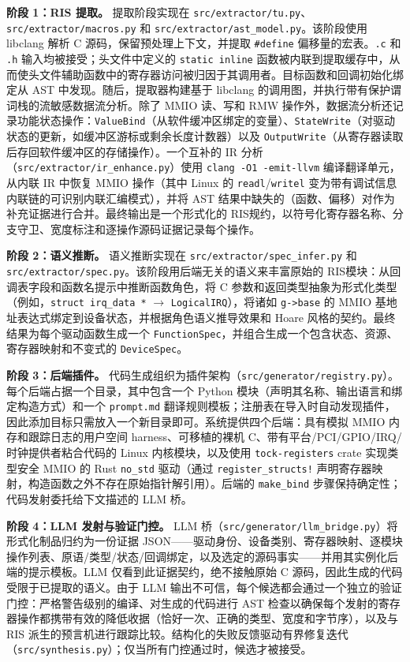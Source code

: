 \documentclass[sigplan, screen, review, anonymous]{acmart}
\newcommand{\rislang}{RIS}
\begin{document}
\textbf{阶段 1：RIS 提取。} 提取阶段实现在 \texttt{src/extractor/tu.py}、\texttt{src/extractor/macros.py} 和 \texttt{src/extractor/ast\_model.py}。该阶段使用 libclang 解析 C 源码，保留预处理上下文，并提取 \texttt{\#define} 偏移量的宏表。\texttt{.c} 和 \texttt{.h} 输入均被接受；头文件中定义的 \texttt{static inline} 函数被内联到提取缓存中，从而使头文件辅助函数中的寄存器访问被归因于其调用者。目标函数和回调初始化绑定从 AST 中发现。随后，提取器构建基于 libclang 的调用图，并执行带有保护谓词栈的流敏感数据流分析。除了 MMIO 读、写和 RMW 操作外，数据流分析还记录功能状态操作：\texttt{ValueBind}（从软件缓冲区绑定的变量）、\texttt{StateWrite}（对驱动状态的更新，如缓冲区游标或剩余长度计数器）以及 \texttt{OutputWrite}（从寄存器读取后存回软件缓冲区的存储操作）。一个互补的 IR 分析（\texttt{src/extractor/ir\_enhance.py}）使用 \texttt{clang -O1 -emit-llvm} 编译翻译单元，从内联 IR 中恢复 MMIO 操作（其中 Linux 的 \texttt{readl}/\texttt{writel} 变为带有调试信息内联链的可识别内联汇编模式），并将 AST 结果中缺失的（函数、偏移）对作为补充证据进行合并。最终输出是一个形式化的 \rislang 规约，以符号化寄存器名称、分支守卫、宽度标注和逐操作源码证据记录每个操作。

\textbf{阶段 2：语义推断。} 语义推断实现在 \texttt{src/extractor/spec\_infer.py} 和 \texttt{src/extractor/spec.py}。该阶段用后端无关的语义来丰富原始的 \rislang 模块：从回调表字段和函数名提示中推断函数角色，将 C 参数和返回类型抽象为形式化类型（例如，\texttt{struct irq\_data *} $\rightarrow$ \texttt{LogicalIRQ}），将诸如 \texttt{g->base} 的 MMIO 基地址表达式绑定到设备状态，并根据角色语义推导效果和 Hoare 风格的契约。最终结果为每个驱动函数生成一个 \texttt{FunctionSpec}，并组合生成一个包含状态、资源、寄存器映射和不变式的 \texttt{DeviceSpec}。

\textbf{阶段 3：后端插件。} 代码生成组织为插件架构（\texttt{src/generator/registry.py}）。每个后端占据一个目录，其中包含一个 Python 模块（声明其名称、输出语言和绑定构造方式）和一个 \texttt{prompt.md} 翻译规则模板；注册表在导入时自动发现插件，因此添加目标只需放入一个新目录即可。系统提供四个后端：具有模拟 MMIO 内存和跟踪日志的用户空间 harness、可移植的裸机 C、带有平台/PCI/GPIO/IRQ/时钟提供者粘合代码的 Linux 内核模块，以及使用 \texttt{tock-registers} crate 实现类型安全 MMIO 的 Rust \texttt{no\_std} 驱动（通过 \texttt{register\_structs!} 声明寄存器映射，构造函数之外不存在原始指针解引用）。后端的 \texttt{make\_bind} 步骤保持确定性；代码发射委托给下文描述的 LLM 桥。

\textbf{阶段 4：LLM 发射与验证门控。} LLM 桥（\texttt{src/generator/llm\_bridge.py}）将形式化制品归约为一份证据 JSON——驱动身份、设备类别、寄存器映射、逐模块操作列表、原语/类型/状态/回调绑定，以及选定的源码事实——并用其实例化后端的提示模板。LLM 仅看到此证据契约，绝不接触原始 C 源码，因此生成的代码受限于已提取的语义。由于 LLM 输出不可信，每个候选都会通过一个独立的验证门控：严格警告级别的编译、对生成的代码进行 AST 检查以确保每个发射的寄存器操作都携带有效的降低收据（恰好一次、正确的类型、宽度和字节序），以及与 RIS 派生的预言机进行跟踪比较。结构化的失败反馈驱动有界修复迭代（\texttt{src/synthesis.py}）；仅当所有门控通过时，候选才被接受。
\end{document}
